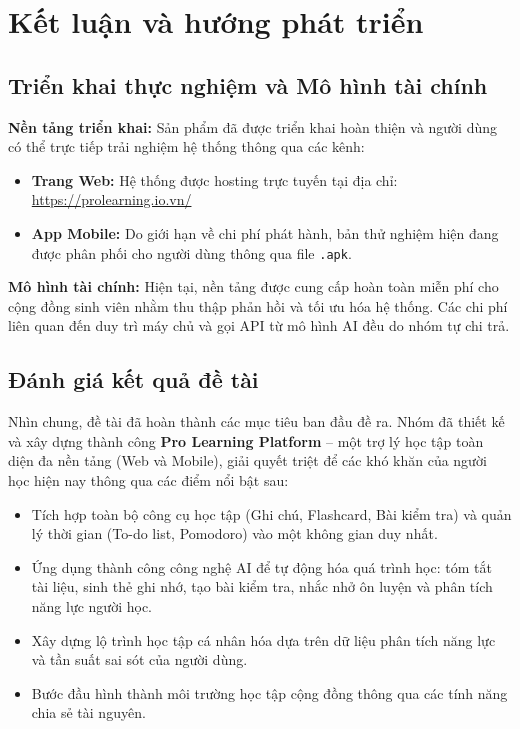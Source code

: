 \chapter{Kết luận và hướng phát triển}
\label{Chapter5}

\section{Triển khai thực nghiệm và Mô hình tài chính}

\textbf{Nền tảng triển khai:} Sản phẩm đã được triển khai hoàn thiện và người dùng có thể trực tiếp trải nghiệm hệ thống thông qua các kênh:
\begin{itemize}
    \item \textbf{Trang Web:} Hệ thống được hosting trực tuyến tại địa chỉ: \url{https://prolearning.io.vn/}
    \item \textbf{App Mobile:} Do giới hạn về chi phí phát hành, bản thử nghiệm hiện đang được phân phối cho người dùng thông qua file \texttt{.apk}.
\end{itemize}

\vspace{0.5em} %

\textbf{Mô hình tài chính:} Hiện tại, nền tảng được cung cấp hoàn toàn miễn phí cho cộng đồng sinh viên nhằm thu thập phản hồi và tối ưu hóa hệ thống. Các chi phí liên quan đến duy trì máy chủ và gọi API từ mô hình AI đều do nhóm tự chi trả.

\section{Đánh giá kết quả đề tài}
Nhìn chung, đề tài đã hoàn thành các mục tiêu ban đầu đề ra. Nhóm đã thiết kế và xây dựng thành công \textbf{Pro Learning Platform} -- một trợ lý học tập toàn diện đa nền tảng (Web và Mobile), giải quyết triệt để các khó khăn của người học hiện nay thông qua các điểm nổi bật sau:
\begin{itemize}
    \item Tích hợp toàn bộ công cụ học tập (Ghi chú, Flashcard, Bài kiểm tra) và quản lý thời gian (To-do list, Pomodoro) vào một không gian duy nhất.
    \item Ứng dụng thành công công nghệ AI để tự động hóa quá trình học: tóm tắt tài liệu, sinh thẻ ghi nhớ, tạo bài kiểm tra, nhắc nhở ôn luyện và phân tích năng lực người học.
    \item Xây dựng lộ trình học tập cá nhân hóa dựa trên dữ liệu phân tích năng lực và tần suất sai sót của người dùng.
    \item Bước đầu hình thành môi trường học tập cộng đồng thông qua các tính năng chia sẻ tài nguyên.
\end{itemize}


